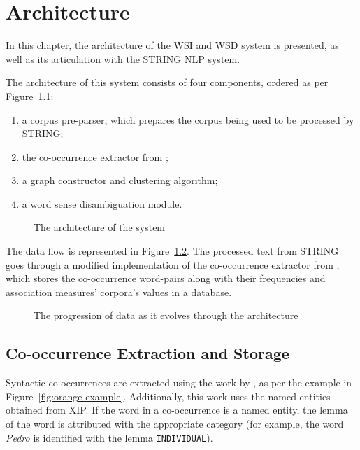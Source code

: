 \chapter{Architecture}
\label{ch:architecture}

In this chapter, the architecture of the \ac{WSI} and \ac{WSD} system is 
presented, as well as its 
articulation with the \ac{STRING} \ac{NLP} system.

The architecture of this system consists of four components, ordered as per
Figure~\ref{fig:architecture}:

\begin{enumerate}
  \item a corpus pre-parser, which prepares the corpus being used to be
processed by \ac{STRING};
  \item the co-occurrence extractor from \citet{correia2015syntax};
  \item a graph constructor and clustering algorithm;
  \item a word sense disambiguation module.
\end{enumerate}

\begin{figure}[ht]
  \caption{The architecture of the system}
  \label{fig:architecture}
  \centering
  
\end{figure}

The data flow is represented in Figure~\ref{fig:data-progression}. The 
processed text from \ac{STRING} 
goes through a modified implementation of the co-occurrence extractor from 
\citet{correia2015syntax}, which stores the co-occurrence word-pairs along with 
their frequencies and association measures' corpora's values in a database.

\begin{figure}[ht]
 \caption{The progression of data as it evolves through the architecture}
 \label{fig:data-progression}
 \centering
 
\end{figure}

\section{Co-occurrence Extraction and Storage}

Syntactic co-occurrences are extracted using the work by
\citet{correia2015syntax}, as per the example in Figure~\ref{fig:orange-example}. Additionally, this work uses the named entities
obtained from \ac{XIP}. If the word in a co-occurrence is a named entity, the
lemma of the word is attributed with the appropriate category (for example, the
word \emph{Pedro} is identified with the lemma \texttt{INDIVIDUAL}).

